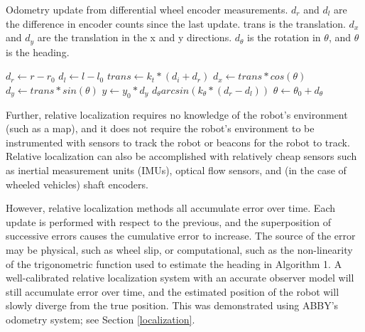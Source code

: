 \documentclass[]{cwru} %
\begin{document}
\begin{algorithm}
\caption{Odometry update from differential wheel encoder measurements. 
$d_r$ and $d_l$ are the difference in encoder counts since the last update. trans 
is the translation. $d_x$ and $d_y$ are the translation in the x and y directions. 
$d_{\theta}$ is the rotation in $\theta$, and $\theta$ is the heading.}
\label{alg1}
\begin{algorithmic}
\STATE $d_r \gets r - r_0$
\STATE $d_l \gets l - l_0$
\STATE $trans \gets k_t * (d_i + d_r)$
\STATE $d_x \gets trans * cos(\theta)$
\STATE $d_y \gets trans * sin(\theta)$
\STATE $y \gets y_0 * d_y$
\STATE $d_\theta arcsin(k_\theta * (d_r - d_l))$
\STATE $\theta \gets \theta_0 + d_\theta$
\end{algorithmic}
\end{algorithm}

Further, relative localization requires no knowledge of the robot's
environment (such as a map), and it does not require the robot's
environment to be instrumented with sensors to track the robot or
beacons for the robot to track. Relative localization can also be
accomplished with relatively cheap sensors such as inertial measurement
units (IMUs), optical flow sensors, and (in the case of wheeled
vehicles) shaft encoders.

However, relative localization methods all accumulate error over time.
Each update is performed with respect to the previous, and the
superposition of successive errors causes the cumulative error to
increase. The source of the error may be physical, such as wheel slip,
or computational, such as the non-linearity of the trigonometric
function used to estimate the heading in Algorithm 1. A well-calibrated
relative localization system with an accurate observer model will still
accumulate error over time, and the estimated position of the robot will
slowly diverge from the true position. This was demonstrated using
ABBY's odometry system; see Section \ref{localization}.
\end{document}

